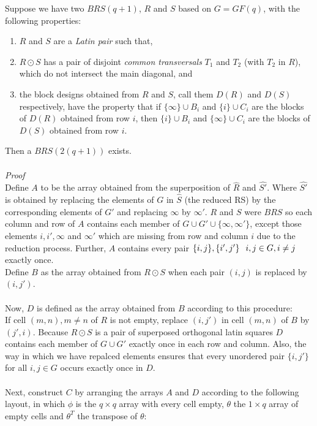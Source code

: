 \documentclass[
  12pt,
  a4paper]{book}
\begin{document}
Suppose we have two \(BRS(q+1)\), \(R\) and \(S\) based on
\(G = GF(q)\), with the following properties:

\begin{enumerate}
\def\labelenumi{\arabic{enumi}.}
\item
  \(R\) and \(S\) are a \emph{Latin pair} such that,
\item
  \(R \odot S\) has a pair of disjoint \emph{common transversals}
  \(T_1\) and \(T_2\) (with \(T_2\) in \(R\)), which do not intersect
  the main diagonal, and
\item
  the block designs obtained from \(R\) and \(S\), call them \(D(R)\)
  and \(D(S)\) respectively, have the property that if
  \(\{\infty\} \cup B_i\) and \(\{i\} \cup C_i\) are the blocks of
  \(D(R)\) obtained from row \(i\), then \(\{i\} \cup B_i\) and
  \(\{\infty\} \cup C_i\) are the blocks of \(D(S)\) obtained from row
  \(i\).
\end{enumerate}

Then a \(BRS(2(q+1))\) exists.\\
~\\
\emph{Proof}\\
Define \(A\) to be the array obtained from the superposition of
\(\hat{R}\) and \(\hat{S'}\). Where \(\hat{S'}\) is obtained by
replacing the elements of \(G\) in \(\hat{S}\) (the reduced RS) by the
corresponding elements of \(G'\) and replacing \(\infty\) by
\(\infty'\). \(R\) and \(S\) were \(BRS\) so each column and row of
\(A\) contains each member of \(G \cup G' \cup \{\infty,\infty'\}\),
except those elements \(i,i',\infty\) and \(\infty'\) which are missing
from row and column \(i\) due to the reduction process. Further, \(A\)
contains every pair
\(\{i,j\},\{i',j'\} \hspace{0.25cm} i,j \in G,i \neq j\) exactly once.\\
Define \(B\) as the array obtained from \(R \odot S\) when each pair
\((i,j)\) is replaced by \((i,j')\).\\
~\\
Now, \(D\) is defined as the array obtained from \(B\) according to this
procedure:\\
If cell \((m,n), m\neq n\) of \(R\) is not empty, replace \((i,j')\) in
cell \((m,n)\) of \(B\) by \((j',i)\). Because \(R \odot S\) is a pair
of superposed orthogonal latin squares \(D\) contains each member of
\(G \cup G'\) exactly once in each row and column. Also, the way in
which we have repalced elements ensures that every unordered pair
\(\{i,j'\}\) for all \(i,j \in G\) occurs exactly once in \(D\).\\
~\\
Next, construct \(C\) by arranging the arrays \(A\) and \(D\) according
to the following layout, in which \(\phi\) is the \(q \times q\) array
with every cell empty, \(\theta\) the \(1 \times q\) array of empty
cells and \(\theta ^T\) the transpose of \(\theta\):
\end{document}
